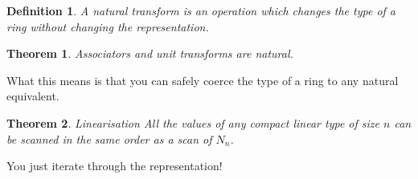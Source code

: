 \documentclass{article}
\newtheorem{theorem}{Theorem}
\newtheorem{definition}{Definition}
\begin{document}
\begin{definition}
A {\em natural transform} is an operation which changes the type
of a ring without changing the representation.
\end{definition}

\begin{theorem}
Associators and unit transforms are natural.
\end{theorem}

What this means is that you can safely coerce the type of a ring
to any natural equivalent.

\begin{theorem}
{\em Linearisation} All the values of any compact linear type of size $n$
can be scanned in the same order as a scan of $N_n$.
\end{theorem}

You just iterate through the representation!
\end{document}
